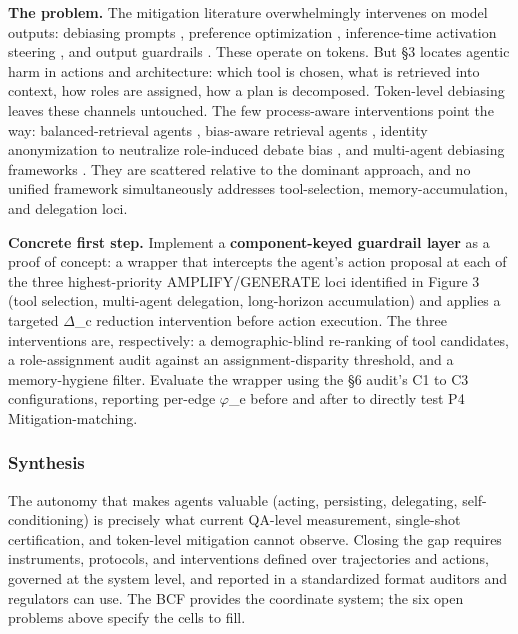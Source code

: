 \documentclass[10pt]{article}
\begin{document}
\textbf{The problem.} The mitigation literature overwhelmingly intervenes on model outputs: debiasing prompts \cite{furniturewala2024thinking,li2024prompting}, preference optimization \cite{allam2024biasdpo,bai2022constitutional}, inference-time activation steering \cite{li2025fairsteer}, and output guardrails \cite{dong2024building}. These operate on tokens. But \S{}3 locates agentic harm in actions and architecture: which tool is chosen, what is retrieved into context, how roles are assigned, how a plan is decomposed. Token-level debiasing leaves these channels untouched. The few process-aware interventions point the way: balanced-retrieval agents \cite{singh2025biasb}, bias-aware retrieval agents \cite{singh2025bias}, identity anonymization to neutralize role-induced debate bias \cite{choi2025identity}, and multi-agent debiasing frameworks \cite{owens2024multi,xu2024mitigating}. They are scattered relative to the dominant approach, and no unified framework simultaneously addresses tool-selection, memory-accumulation, and delegation loci.

\textbf{Concrete first step.} Implement a \textbf{component-keyed guardrail layer} as a proof of concept: a wrapper that intercepts the agent's action proposal at each of the three highest-priority AMPLIFY/GENERATE loci identified in Figure 3 (tool selection, multi-agent delegation, long-horizon accumulation) and applies a targeted $\Delta$\_c reduction intervention before action execution. The three interventions are, respectively: a demographic-blind re-ranking of tool candidates, a role-assignment audit against an assignment-disparity threshold, and a memory-hygiene filter. Evaluate the wrapper using the \S{}6 audit's C1 to C3 configurations, reporting per-edge $\varphi$\_e before and after to directly test P4 Mitigation-matching.

\subsubsection*{Synthesis}

The autonomy that makes agents valuable (acting, persisting, delegating, self-conditioning) is precisely what current QA-level measurement, single-shot certification, and token-level mitigation cannot observe. Closing the gap requires instruments, protocols, and interventions defined over trajectories and actions, governed at the system level, and reported in a standardized format auditors and regulators can use. The BCF provides the coordinate system; the six open problems above specify the cells to fill.
\end{document}
